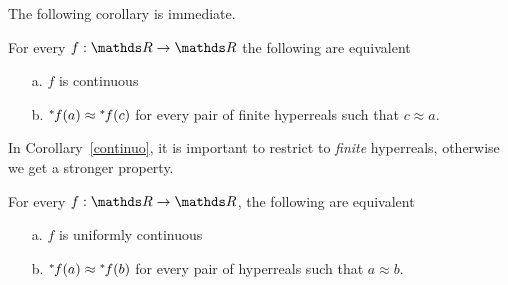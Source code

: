 The following corollary is immediate.

\begin{corollary} \label{continuo} For every $f:\RR\to\RR$ the following are equivalent
\begin{itemize}
\item[a.] $f$ is continuous
\item[b.] ${}^*\kern-.2ex f(a)\approx {}^*\kern-.2ex f(c)$ for every pair of finite hyperreals such that $c\approx a$.
\end{itemize}
\end{corollary}

In Corollary~\ref{continuo}, it is important to restrict  to \textit{finite\/} hyperreals, otherwise we get a stronger property.

\begin{proposition}\label{prop_unif_cont}
   For every $f:\RR\to\RR$, the following are equivalent
\begin{itemize}
\item[a.] $f$ is uniformly continuous
\item[b.] ${}^*\kern-.2ex f(a)\approx{}^*\kern-.2ex  f(b)$ for every pair of hyperreals such that $a\approx b$.
\end{itemize}
\end{proposition}

